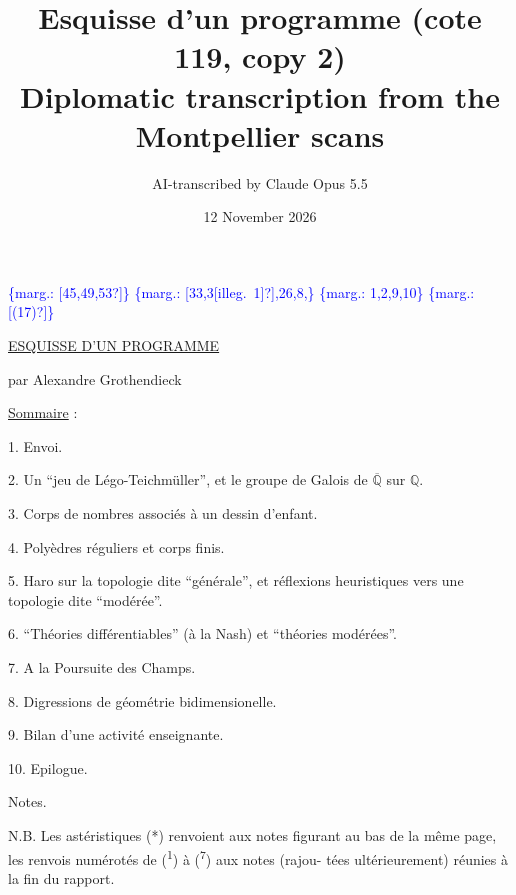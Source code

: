 \documentclass[11pt]{article}
\title{Esquisse d'un programme (cote 119, copy 2)\\[4pt]\large Diplomatic transcription from the Montpellier scans}
\author{AI-transcribed by Claude Opus 5.5}
\date{12 November 2026}
\newcommand{\scanpage}[1]{\par\bigskip\noindent{\small\sffamily[scan #1]}\par}
\newcommand{\mspage}[1]{{\small\sffamily[p.\,#1]}}
\newcommand{\hand}[1]{\textcolor{blue}{#1}}
\newcommand{\margin}[1]{\textcolor{blue}{\{\textsf{marg.:} #1\}}}
\newcommand{\uline}[1]{\underline{#1}}
\newcommand{\unsure}[1]{[#1?]}
\newcommand{\illegible}[1]{[\textsf{illeg.\ #1}]}
\begin{document}
\maketitle

\scanpage{119/78}
\margin{\unsure{45,49,53}}
\margin{\unsure{33,3\illegible{1}},26,8,}
\margin{1,2,9,10}
\margin{\unsure{(17)}}

\uline{ESQUISSE D'UN PROGRAMME}

par Alexandre Grothendieck

\uline{Sommaire} :

1. Envoi.

2. Un ``jeu de Légo-Teichmüller'', et le groupe de Galois de $\overline{\mathbb{Q}}$ sur $\mathbb{Q}$.

3. Corps de nombres associés à un dessin d'enfant.

4. Polyèdres réguliers et corps finis.

5. Haro sur la topologie dite ``générale'', et réflexions heuristiques
vers une topologie dite ``modérée''.

6. ``Théories différentiables'' (à la Nash) et ``théories modérées''.

7. A la Poursuite des Champs.

8. Digressions de géométrie bidimensionelle.

9. Bilan d'une activité enseignante.

10. Epilogue.

Notes.

N.B. Les astéristiques (*) renvoient aux notes figurant au bas de
la même page, les renvois numérotés de (\textsuperscript{1}) à (\textsuperscript{7}) aux notes (rajou-%
tées ultérieurement) réunies à la fin du rapport.

\mspage{\hand{78}}

\clearpage
\scanpage{119/79}
\mspage{1}
\end{document}
